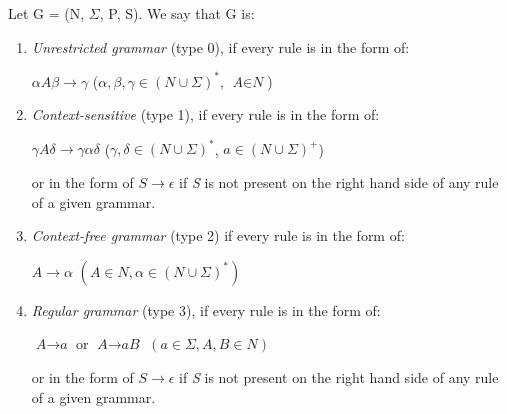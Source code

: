 \begin{definition}
    Let G = (N, $\Sigma$, P, S). We say that G is:
\end{definition}
\begin{enumerate}
    \item \textit{Unrestricted grammar} (type 0), if every rule is in the form of:
    
    \centerline{$\alpha\textit{A}\beta \rightarrow \gamma$ ($\alpha, \beta, \gamma \in (\textit{N} \cup \Sigma)^*$, $\textit{A} \in \textit{N}$)}
    \item \textit{Context-sensitive} (type 1), if every rule is in the form of:

    \centerline{$\gamma\textit{A}\delta \rightarrow \gamma\alpha\delta$ ($\gamma, \delta \in (\textit{N} \cup \Sigma)^*$, $\textit{a} \in (\textit{N} \cup \Sigma)^+$)}
    or in the form of $\textit{S} \rightarrow \epsilon$ if \textit{S} is not present on the right hand side of any rule of a given grammar.
    \item \textit{Context-free grammar} (type 2) if every rule is in the form of:

    \centerline{$\textit{A} \rightarrow \alpha$ $(\textit{A} \in \textit{N}, \alpha \in (N \cup \Sigma)^*)$}
    \item \textit{Regular grammar} (type 3), if every rule is in the form of:

    \centerline{$\textit{A} \rightarrow \textit{a}$ or $\textit{A} \rightarrow \textit{aB}$ $(\textit{a} \in \Sigma, \textit{A}, \textit{B} \in \textit{N})$}
    or in the form of $\textit{S} \rightarrow \epsilon$ if \textit{S} is not present on the right hand side of any rule of a given grammar.
\end{enumerate}

